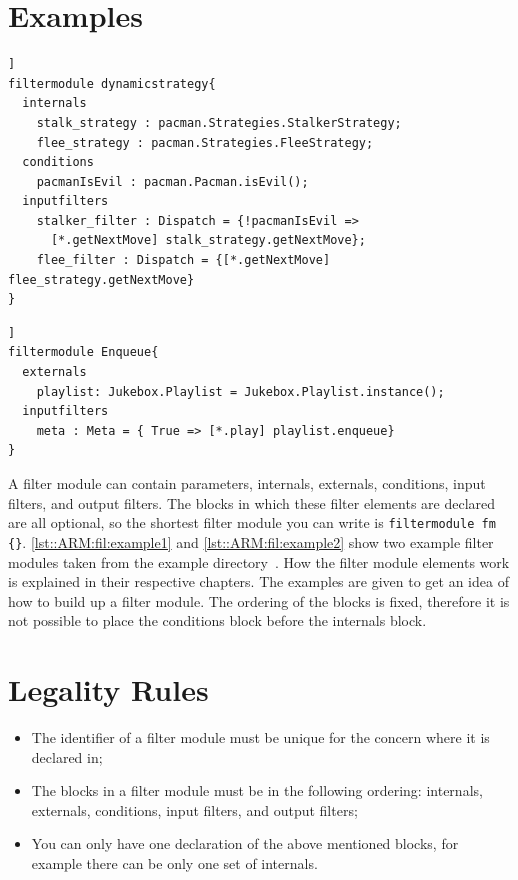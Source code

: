 \section{Examples}
\begin{lstlisting}[caption={Dynamic strategy filter module from Pacman },label=lst::ARM:fil:example1,style=listing,language=ComposeStar,float=[tpb]]
filtermodule dynamicstrategy{
  internals
    stalk_strategy : pacman.Strategies.StalkerStrategy;
    flee_strategy : pacman.Strategies.FleeStrategy;   
  conditions
    pacmanIsEvil : pacman.Pacman.isEvil();
  inputfilters
    stalker_filter : Dispatch = {!pacmanIsEvil => 
      [*.getNextMove] stalk_strategy.getNextMove};
    flee_filter : Dispatch = {[*.getNextMove] flee_strategy.getNextMove}
}
\end{lstlisting}
\begin{lstlisting}[caption={Enqueue filter module from Jukebox },label=lst::ARM:fil:example2,style=listing,language=ComposeStar,float=[tpb]]
filtermodule Enqueue{
  externals
    playlist: Jukebox.Playlist = Jukebox.Playlist.instance();
  inputfilters
    meta : Meta = { True => [*.play] playlist.enqueue}
}
\end{lstlisting}
A filter module can contain parameters, internals, externals, conditions, input filters, and output filters.
The blocks in which these filter elements are declared are all optional, so the shortest filter module you can write is \lstinline!filtermodule fm {}!. 
\autoref{lst::ARM:fil:example1} and \autoref{lst::ARM:fil:example2} show two example filter modules taken from the \Compose* example directory~\cite{Composestar}. 
How the filter module elements work is explained in their respective chapters.
The examples are given to get an idea of how to build up a filter module.
The ordering of the blocks is fixed, therefore it is not possible to place the conditions block before the internals block.

\section{Legality Rules}
\begin{itemize}[noitemsep]
\item The identifier of a filter module must be unique for the concern where it is declared in;
\item The blocks in a filter module must be in the following ordering: internals, externals, conditions, input filters, and output filters;
\item You can only have one declaration of the above mentioned blocks, for example there can be only one set of internals.
\end{itemize}

\comments{

}
